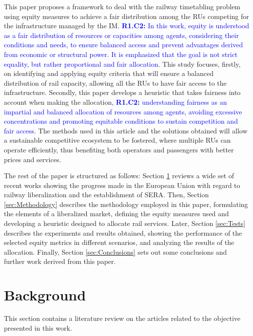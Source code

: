 \documentclass[preprint,12pt]{elsarticle}
\begin{document}
This paper proposes a framework to deal with the railway timetabling problem using equity measures to achieve a fair distribution among the \glspl{RU} competing for the infrastructure managed by the \gls{IM}. \textcolor{blue}{\textbf{R1.C2:} In this work, equity is understood as a fair distribution of resources or capacities among agents, considering their conditions and needs, to ensure balanced access and prevent advantages derived from economic or structural power. It is emphasized that the goal is not strict equality, but rather proportional and fair allocation}. This study focuses, firstly, on identifying and applying equity criteria that will ensure a balanced distribution of rail capacity, allowing all the \glspl{RU} to have fair access to the infrastructure. Secondly, this paper develops a heuristic that takes fairness into account when making the allocation, \textcolor{blue}{\textbf{R1.C2:} understanding fairness as an impartial and balanced allocation of resources among agents, avoiding excessive concentrations and promoting equitable conditions to sustain competition and fair access}. The methods used in this article and the solutions obtained will allow a sustainable competitive ecosystem to be fostered, where multiple \glspl{RU} can operate efficiently, thus benefiting both operators and passengers with better prices and services.

The rest of the paper is structured as follows: Section \ref{sec:background} reviews a wide set of recent works showing the progress made in the European Union with regard to railway liberalization and the establishment of \gls{SERA}. Then, Section \ref{sec:Methodology} describes the methodology employed in this paper, formulating the elements of a liberalized market, defining the equity measures used and developing a heuristic designed to allocate rail services. Later, Section \ref{sec:Tests} describes the experiments and results obtained, showing the performance of the selected equity metrics in different scenarios, and analyzing the results of the allocation. Finally, Section \ref{sec:Conclusions} sets out some conclusions and further work derived from this paper.

\section{Background}\label{sec:background}

This section contains a literature review on the articles related to the objective presented in this work.
\end{document}
